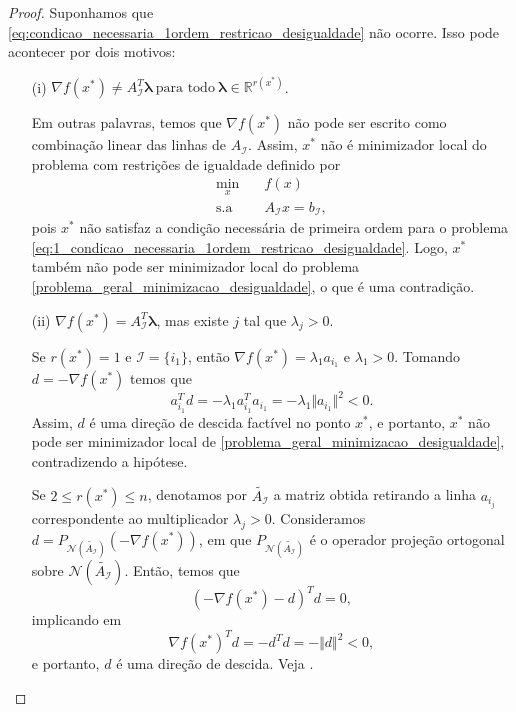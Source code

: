 \documentclass[12pt,a4paper]{scrartcl}
\def\RR{\mathds{R}}
\theoremstyle{definition}%
\begin{document}
\begin{proof}
Suponhamos que \eqref{eq:condicao_necessaria_1ordem_restricao_desigualdade} não ocorre. Isso pode acontecer por dois motivos:
\begin{enumerate}
\item[(i)] $\nabla f(x^{*}) \neq A_{\mathcal{I}}^{T} \boldsymbol{\lambda} \ \text{para todo} \ \boldsymbol{\lambda} \in \RR^{r(x^{*})}$.

Em outras palavras, temos que $\nabla f(x^{*})$ não pode ser escrito como combinação linear das linhas de $A_{\mathcal{I}}$. Assim, $x^{*}$ não é minimizador local do problema com restrições de igualdade definido por 
\[ \label{eq:1_condicao_necessaria_1ordem_restricao_desigualdade}
\begin{aligned}
\min_{x} & \quad f(x) \\
\text{s.a} & \quad A_{\mathcal{I}}x=b_{\mathcal{I}} ,
\end{aligned}
\]
pois $x^{*}$ não satisfaz a condição necessária de primeira ordem para o problema \eqref{eq:1_condicao_necessaria_1ordem_restricao_desigualdade}. Logo, $x^{*}$ também não pode ser minimizador local do problema \eqref{problema_geral_minimizacao_desigualdade}, o que é uma contradição.

\item[(ii)] $\nabla f(x^{*}) = A_{\mathcal{I}}^{T} \boldsymbol{\lambda}$, mas existe $j$ tal que $\lambda_{j} >0$.

Se $r(x^{*}) = 1$ e $\mathcal{I} = \{ i_{1} \}$, então $\nabla f(x^{*}) = \lambda_{1} a_{i_{1}}$ e $\lambda_{1} >0$. Tomando $d=-\nabla f(x^{*})$ temos que
\[
a_{i_{1}}^{T}d = -\lambda_{1} a_{i_{1}}^{T}a_{i_{1}} = -\lambda_{1} \Vert a_{i_{1}} \Vert^{2} < 0.
\]
Assim, $d$ é uma direção de descida factível no ponto $x^{*}$, e portanto, $x^{*}$ não pode ser minimizador local de \eqref{problema_geral_minimizacao_desigualdade}, contradizendo a hipótese.

Se $2\leq r(x^{*}) \leq n$, denotamos por $\tilde{A_{\mathcal{I}}}$ a matriz obtida retirando a linha $a_{i_{j}}$ correspondente ao multiplicador $\lambda_{j} >0$. Consideramos $d=P_{\mathcal{N}(\tilde{A_{\mathcal{I}}})} (-\nabla f(x^{*}))$, em que $P_{\mathcal{N}(\tilde{A_{\mathcal{I}}})}$ é o operador projeção ortogonal sobre $\mathcal{N}(\tilde{A_{\mathcal{I}}})$. Então, temos que
\[
(-\nabla f(x^{*}) -d)^{T}d =0,
\]
implicando em
\[ \label{eq:2_condicao_necessaria_1ordem_restricao_desigualdade}
\nabla f(x^{*})^{T}d = -d^{T}d = -\Vert d \Vert^{2} <0,
\]
e portanto, $d$ é uma direção de descida. Veja .


\end{enumerate}
\end{proof}
\end{document}
